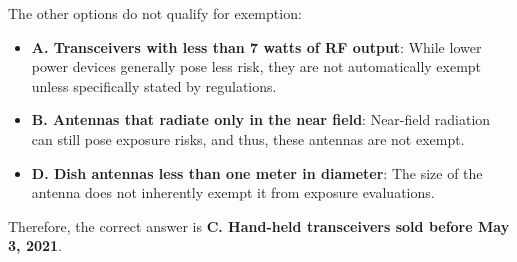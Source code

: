 The other options do not qualify for exemption:
\begin{itemize}
    \item \textbf{A. Transceivers with less than 7 watts of RF output}: While lower power devices generally pose less risk, they are not automatically exempt unless specifically stated by regulations.
    \item \textbf{B. Antennas that radiate only in the near field}: Near-field radiation can still pose exposure risks, and thus, these antennas are not exempt.
    \item \textbf{D. Dish antennas less than one meter in diameter}: The size of the antenna does not inherently exempt it from exposure evaluations.
\end{itemize}

Therefore, the correct answer is \textbf{C. Hand-held transceivers sold before May 3, 2021}.


